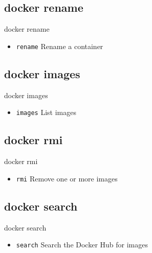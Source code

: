 \subsection{docker rename}\label{subsec:docker-rename}
\begin{frame}{docker rename}
    \begin{itemize}
        \item \texttt{rename} Rename a container
        \pause
        
    \end{itemize}
\end{frame}

\subsection{docker images}\label{subsec:docker-images}
\begin{frame}{docker images}
    \begin{itemize}
        \item \texttt{images} List images
        \pause
        
    \end{itemize}
\end{frame}

\subsection{docker rmi}\label{subsec:docker-rmi}
\begin{frame}{docker rmi}
    \begin{itemize}
        \item \texttt{rmi} Remove one or more images
        \pause
        
    \end{itemize}
\end{frame}

\subsection{docker search}\label{subsec:docker-search}
\begin{frame}{docker search}
    \begin{itemize}
        \item \texttt{search} Search the Docker Hub for images
        \pause
        
    \end{itemize}
\end{frame}

